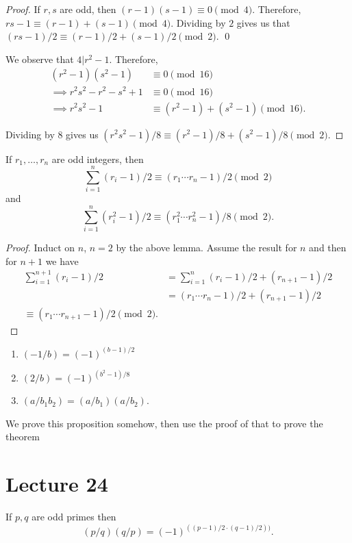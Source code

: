 \documentclass{article}
\begin{document}
\begin{proof}
	If $r, s$ are odd, then $(r - 1)(s - 1) \equiv 0 \pmod 4$. Therefore, $rs - 1 \equiv (r-1) + (s-1) \pmod 4$. Dividing by $2$ gives us that $(rs - 1)/2 \equiv (r - 1)/2 + (s - 1)/2 \pmod 2$. \qed

	We observe that $4 | r^2 - 1$. Therefore, 
	\begin{align*}
		(r^2 - 1)(s^2 - 1) &\equiv 0 \pmod {16} \\
		\implies r^2s^2 - r^2 - s^2 + 1 &\equiv 0 \pmod {16} \\
		\implies r^2s^2 - 1 &\equiv (r^2 - 1) + (s^2 - 1) \pmod{16}.
	\end{align*}

	Dividing by $8$ gives us $(r^2s^2 - 1)/8 \equiv (r^2 - 1)/8 + (s^2 - 1)/8 \pmod 2$.
\end{proof}

\begin{corollary}
	If $r_1, \ldots, r_n$ are odd integers, then 
	\[\sum_{i = 1}^n (r_i - 1)/2 \equiv (r_1\cdots r_n - 1)/2 \pmod 2\] and 
	\[\sum_{i = 1}^n (r_i^2 - 1)/2 \equiv (r_1^2\cdots r_n^2 - 1)/ 8 \pmod 2.\] 
\end{corollary}

\begin{proof}
	Induct on $n$, $n = 2$ by the above lemma. Assume the result for $n$ and then for $n+1$ we have 
	\begin{align*}
		\sum_{i = 1}^{n+1} (r_i - 1)/2 &= \sum_{i=1}^n (r_i - 1)/2 + (r_{n+1}-1)/2 \\
									   &= (r_1 \cdots r_n - 1)/2 + (r_{n+1}-1)/2 \\
									   \equiv (r_1 \cdots r_{n+1} - 1)/2 \pmod 2.
	\end{align*}
\end{proof}

\begin{proposition}
	\begin{enumerate}[label=(\roman*)] 
		\item $(-1 / b) = (-1)^{(b-1)/2}$ 
		\item $(2 / b) = (-1)^{(b^2 - 1)/8}$
		\item $(a / b_1b_2) = (a/b_1)(a/b_2)$.
	\end{enumerate}
\end{proposition}

We prove this proposition somehow, then use the proof of that to prove the theorem 

\section{Lecture 24}
\begin{theorem} 
	If $p, q$ are odd primes then \[(p/q)(q/p) = (-1)^{((p-1)/2 \cdot (q-1)/2))}.\]
\end{theorem}
\end{document}
